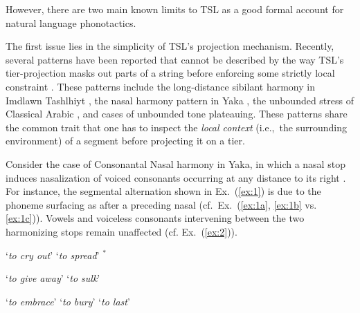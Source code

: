 \documentclass[11pt,a4paper]{article}
\begin{document}
However, there are two main known limits to TSL as a good formal account for natural language phonotactics.

The first issue  lies in the simplicity of TSL's projection mechanism.
Recently, several patterns have been reported that cannot be described by the way TSL's tier-projection masks out parts of a string before enforcing some strictly local constraint \citep{McMullin16,MayerMajor18,Baek2017CLS,graf2018sanskrit,desanto2019structure}.
These patterns include the long-distance sibilant harmony in Imdlawn Tashlhiyt  \citep{McMullin16}, the nasal harmony pattern in Yaka \cite{WalkerYaka}, the unbounded stress of Classical Arabic \cite[see][and references therein]{Baek2017CLS}, and cases of unbounded tone plateauing.
These patterns share the common trait that one has to inspect the \emph{local context} (i.e.,~the surrounding environment) of a segment before projecting it on a tier. 

Consider the case of Consonantal Nasal harmony in Yaka, in which a nasal stop induces nasalization of voiced consonants occurring at any distance to its right  \cite{hyman1995nasal,WalkerYaka}.
For instance, the  segmental alternation shown in  Ex.~(\ref{ex:1}) is due to the phoneme  surfacing as  \textipa{[n]} after a preceding nasal  (cf.~Ex.~(\ref{ex:1a}, \ref{ex:1b} vs.  \ref{ex:1c})).\@
Vowels and voiceless consonants intervening between the two harmonizing stops remain unaffected  (cf. Ex.~(\ref{ex:2})).


\begin{exe}
    \ex\label{ex:1}\begin{xlist}
    	 \ex\label{ex:1a}    `\emph{to cry out}'
	 \ex\label{ex:1b}    `\emph{to spread}'
	 \ex\label{ex:1c} $^*$      
	\end{xlist}
    \ex\label{ex:2}\begin{xlist}
     	\ex\label{ex:2a} `\emph{to give away}'
    	\ex\label{ex:2b} `\emph{to sulk}'
    \end{xlist}
     \ex\label{ex:3}\begin{xlist}
    	 \ex\label{ex:3a}     `\emph{to embrace}'
	 \ex\label{ex:3b}   `\emph{to bury}'
	 \ex\label{ex:3c}   `\emph{to last}'
	\end{xlist}
\end{exe}
\end{document}
